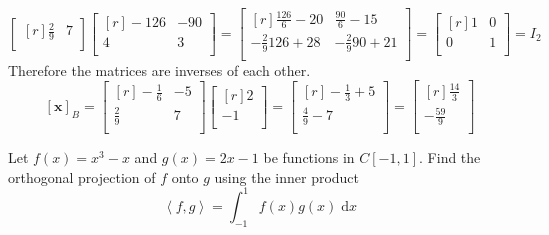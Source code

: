 \documentclass{article}
\theoremstyle{definition}
\newenvironment{solution}[1][]{\begin{replacementsoln}}{\end{replacementsoln}}
\begin{document}
\begin{solution}
\[\begin{bmatrix}[r]
       \frac{2}{9}&  7 \\
    \end{bmatrix}\begin{bmatrix}[r]
      -126 &-90   \\
       4&3   \\
    \end{bmatrix}= \begin{bmatrix}[r]
      \frac{126}{6}-20 &\frac{90}{6}-15   \\[5pt]
       -\frac{2}{9}126+28&-\frac{2}{9}90+21   \\
    \end{bmatrix} = \begin{bmatrix}[r]
      1 &0   \\
      0 &1   \\
    \end{bmatrix}=I_2
  \]
  Therefore the matrices are inverses of each other.
  \[
    [\mathbf{x}]_B = \begin{bmatrix}[r]
      -\frac{1}{6} &-5   \\[5pt]
       \frac{2}{9}&  7 \\
    \end{bmatrix} \begin{bmatrix}[r]
       2 \\
       -1 \\
    \end{bmatrix} = \begin{bmatrix}[r]
        -\frac{1}{3}+5\\[5pt]
        \frac{4}{9}-7\\
    \end{bmatrix} = \begin{bmatrix}[r]
        \frac{14}{3}\\[5pt]
        -\frac{59}{9}\\
    \end{bmatrix}
  \]
\end{solution}

\begin{exercise}
    Let $f(x) =x^3 -x$ and $g(x)=2x-1$ be functions in  $C[-1, 1]$.  Find the orthogonal projection of $f$ onto $g$ using the inner product \[ \left\langle f, g \right\rangle = \int^1_{-1}f(x) g(x)  \; \mathrm{d}x\]
\end{exercise}
\end{document}

